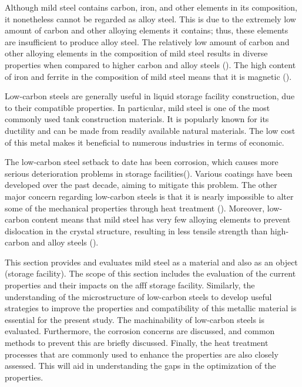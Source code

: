 Although mild steel contains carbon, iron, and other elements in its composition, it nonetheless cannot be regarded as alloy steel. This is due to the extremely low amount of carbon and other alloying elements it contains; thus, these elements are insufficient to produce alloy steel. The relatively low amount of carbon and other alloying elements in the composition of mild steel results in diverse properties when compared to higher carbon and alloy steels (\cite{timings2008fabrication}). The high content of iron and ferrite in the composition of mild steel means that it is magnetic (\cite{li2018effect}).

Low-carbon steels are generally useful in liquid storage facility construction, due to their compatible properties. In particular, mild steel is one of the most commonly used tank construction materials. It is popularly known for its ductility and can be made from readily available natural materials. The low cost of this metal makes it beneficial to numerous industries in terms of economic.

The low-carbon steel setback to date has been corrosion, which causes more serious deterioration problems in storage facilities(\cite{erami2019carboxamide}). Various coatings have been developed over the past decade, aiming to mitigate this problem. The other major concern regarding low-carbon steels is that it is nearly impossible to alter some of the mechanical properties through heat treatment (\cite{callister2018materials}). Moreover, low-carbon content means that mild steel has very few alloying elements to prevent dislocation in the crystal structure, resulting in less tensile strength than high-carbon and alloy steels (\cite{callister2018materials}).

This section provides and evaluates mild steel as a material and also as an object (storage facility). The scope of this section includes the evaluation of the current properties and their impacts on the \acrshort{afff} storage facility. Similarly, the understanding of the microstructure of low-carbon steels to develop useful strategies to improve the properties and compatibility of this metallic material is essential for the present study. The machinability of low-carbon steels is evaluated. Furthermore, the corrosion concerns are discussed, and common methods to prevent this are briefly discussed. Finally, the heat treatment processes that are commonly used to enhance the properties are also closely assessed. This will aid in understanding the gaps in the optimization of the properties.

